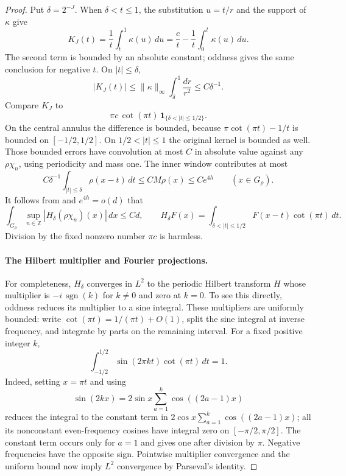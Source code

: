 \begin{proof}
Put $\delta=2^{-J}$. When $\delta<t\le1$, the substitution $u=t/r$
and the support of $\kappa$ give
\[
 K_J(t)=\frac1t\int_t^1\kappa(u)\,du
       =\frac ct-\frac1t\int_0^t\kappa(u)\,du.
\]
The second term is bounded by an absolute constant; oddness gives
the same conclusion for negative $t$. On $|t|\le\delta$,
\[
 |K_J(t)|\le \|\kappa\|_\infty
                    \int_\delta^1\frac{dr}{r^2}\le C\delta^{-1}.
\]
Compare $K_J$ to
\[
 \pi c\,\cot(\pi t)\,
                \mathbf1_{\{\delta<|t|\le1/2\}}.
\]
On the central annulus the difference is bounded, because
$\pi\cot(\pi t)-1/t$ is bounded on $[-1/2,1/2]$.
On $1/2<|t|\le1$ the original kernel is bounded as well.
Those bounded errors have convolution at most $C$ in absolute value
against any $\rho\chi_n$, using periodicity and mass one.
The inner window contributes at most
\[
 C\delta^{-1}\int_{|t|\le\delta}\rho(x-t)\,dt
 \le C M\rho(x)\le Ce^{4h}\qquad(x\in G_\rho).
\]
It follows from  and $e^{4h}=o(d)$ that
\begin{equation}\label{eq:fourier-truncated-H}
 \int_{G_\rho}\sup_{n\in\mathbb Z}
                      |H_\delta(\rho\chi_n)(x)|\,dx\le Cd,
 \qquad
 H_\delta F(x)=
 \int_{\delta<|t|\le1/2}F(x-t)\cot(\pi t)\,dt.
\end{equation}
Division by the fixed nonzero number $\pi c$ is harmless.

\paragraph{The Hilbert multiplier and Fourier projections.}
For completeness, $H_\delta$ converges in $L^2$ to the periodic
Hilbert transform $H$ whose multiplier is
$-i\,\operatorname{sgn}(k)$ for $k\ne0$ and zero at $k=0$.
To see this directly, oddness reduces its multiplier to a sine
integral. These multipliers are uniformly bounded: write
$\cot(\pi t)=1/(\pi t)+O(1)$, split the sine integral at inverse
frequency, and integrate by parts on the remaining interval.
For a fixed positive integer $k$,
\begin{equation}\label{eq:fourier-symbol}
 \int_{-1/2}^{1/2}\sin(2\pi kt)\cot(\pi t)\,dt=1.
\end{equation}
Indeed, setting $x=\pi t$ and using
\[
 \sin(2kx)=2\sin x\sum_{a=1}^k\cos((2a-1)x)
\]
reduces the integral to the constant term in
$2\cos x\sum_{a=1}^k\cos((2a-1)x)$; all its nonconstant even-frequency
cosines have integral zero on $[-\pi/2,\pi/2]$.
The constant term occurs only for $a=1$ and gives one after division
by $\pi$. Negative frequencies have the opposite sign.
Pointwise multiplier convergence and the uniform bound now imply
$L^2$ convergence by Parseval's identity.


\end{proof}

